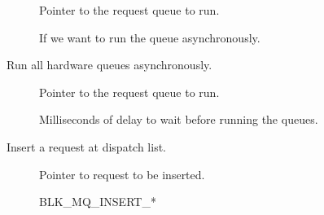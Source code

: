 \documentclass[a4paper,11pt,english]{sphinxmanual}
\begin{document}
\begin{description}
\item[{}] \leavevmode
Pointer to the request queue to run.

\item[{}] \leavevmode
If we want to run the queue asynchronously.

\end{description}

\begin{fulllineitems}
\label{\detokenize{blk-mq:c.blk_mq_delay_run_hw_queues}}
Run all hardware queues asynchronously.

\end{fulllineitems}


\begin{description}
\item[{}] \leavevmode
Pointer to the request queue to run.

\item[{}] \leavevmode
Milliseconds of delay to wait before running the queues.

\end{description}

\begin{fulllineitems}
\label{\detokenize{blk-mq:c.blk_mq_request_bypass_insert}}
Insert a request at dispatch list.

\end{fulllineitems}


\begin{description}
\item[{}] \leavevmode
Pointer to request to be inserted.

\item[{}] \leavevmode
BLK\_MQ\_INSERT\_*

\end{description}
\end{document}
